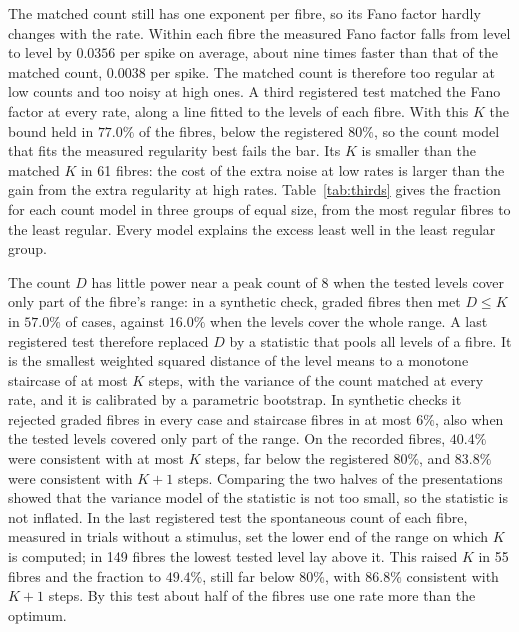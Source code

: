 \documentclass[10pt,letterpaper]{article}
\begin{document}
The matched count still has one exponent per fibre, so its Fano factor hardly changes with the rate. Within each fibre the measured
Fano factor falls from level to level by $0.0356$ per spike on average, about nine times faster than that of the matched count,
$0.0038$ per spike. The matched count is therefore too regular at
low counts and too noisy at high ones. A third registered test matched the Fano factor at every rate, along a line fitted to the
levels of each fibre. With this $K$ the bound held in $77.0\%$ of the fibres, below the registered $80\%$, so the count model that fits
the measured regularity best fails the bar. Its $K$ is smaller than the matched $K$ in 61 fibres: the cost of the extra noise at low
rates is larger than the gain from the extra regularity at high rates. Table~\ref{tab:thirds} gives the fraction for each count model in
three groups of equal size, from the most regular fibres to the least regular. Every model explains the excess least well in the
least regular group.

The count $D$ has little power near a peak count of 8 when the tested levels cover only part of the fibre's range: in a synthetic
check, graded fibres then met $D\le K$ in $57.0\%$ of cases, against $16.0\%$ when the levels cover the whole range. A last registered test therefore replaced $D$ by a statistic that pools
all levels of a fibre. It is the smallest weighted squared distance of the level means to a monotone staircase of at most $K$ steps, with the
variance of the count matched at every rate, and it is calibrated by a parametric bootstrap. In synthetic checks it rejected graded
fibres in every case and staircase fibres in at most $6\%$, also when the tested levels covered only part of the range. On the
recorded fibres, $40.4\%$ were consistent with at most $K$ steps, far below the registered $80\%$, and $83.8\%$ were consistent with
$K+1$ steps. Comparing the two halves of the presentations showed that the variance model of the statistic is not too small, so the
statistic is not inflated. In the last registered test the spontaneous count of each fibre, measured in trials without a stimulus,
set the lower end of the range on which $K$ is computed; in 149 fibres the lowest tested level lay above it. This raised $K$ in 55
fibres and the fraction to $49.4\%$, still far below $80\%$, with $86.8\%$ consistent with $K+1$ steps. By this test about half of the
fibres use one rate more than the optimum.
\end{document}
